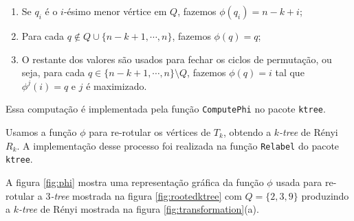 \begin{algorithm}
\begin{step}
    \begin{enumerate}
      \item Se $q_i$ é o $i$-ésimo menor vértice em $Q$, fazemos $\phi(q_i) = n-k+i$;
      \item Para cada $q \not \in Q \cup \{n-k+1, \cdots, n\}$, fazemos $\phi(q) = q$;
      \item O restante dos valores são usados para fechar os ciclos de permutação, ou seja, para cada $q \in \{n-k+1, \cdots, n\} \setminus Q$, fazemos $\phi(q) = i$ tal que $\phi^j(i) = q$ e $j$ é maximizado.
    \end{enumerate}

    Essa computação é implementada pela função {\tt ComputePhi} no pacote {\tt ktree}.

    Usamos a função $\phi$ para re-rotular os vértices de $T_k$, obtendo a \emph{$k$-tree} de Rényi $R_k$. A implementação desse processo foi realizada na função {\tt Relabel} do pacote {\tt ktree}.

    A figura \ref{fig:phi} mostra uma representação gráfica da função $\phi$ usada para re-rotular a \emph{$3$-tree} mostrada na figura \ref{fig:rootedktree} com $Q = \{2, 3, 9\}$ produzindo a \emph{$k$-tree} de Rényi mostrada na figura \ref{fig:transformation}(a).

    \begin{figure}
      \centering


\end{figure}
\end{step}
\end{algorithm}
